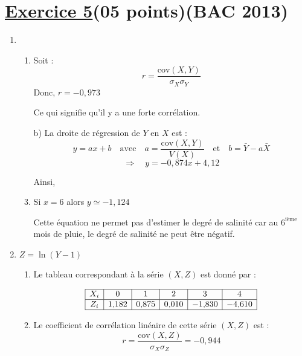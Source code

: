 \documentclass[12pt,a4paper]{article}
\begin{document}
\section*{\underline{Exercice 5}(05 points)(BAC 2013)}
\begin{enumerate}
    \item 
    \begin{enumerate}
        \item Soit : 
        \[
        r = \frac{\text{cov}(X, Y)}{\sigma_X \sigma_Y}
        \]
        Donc, \( r = -0{,}973 \)

        Ce qui signifie qu'il y a une forte corrélation.

        \item[b)] La droite de régression de \( Y \) en \( X \) est :
        \[
        y = ax + b \quad \text{avec} \quad 
        a = \frac{\text{cov}(X, Y)}{V(X)} 
        \quad \text{et} \quad 
        b = \bar{Y} - a\bar{X}
        \]
        \[
        \Rightarrow \quad y = -0{,}874x + 4{,}12
        \]

        Ainsi, 

        \item Si \( x = 6 \) alors \( y \simeq -1{,}124 \)

        Cette équation ne permet pas d'estimer le degré de salinité car au \( 6^{\text{ième}} \) mois de pluie, le degré de salinité ne peut être négatif.
    \end{enumerate}

    \item \( Z = \ln(Y - 1) \)

    \begin{enumerate}
        \item Le tableau correspondant à la série \( (X, Z) \) est donné par :

        \[
        \begin{array}{|c|c|c|c|c|c|c|}
        \hline
        X_i & 0 & 1 & 2 & 3 & 4 \\
        \hline
        Z_i & 1{,}182 & 0{,}875 & 0{,}010 & -1{,}830 & -4{,}610 \\
        \hline
        \end{array}
        \]

    \item  Le coefficient de corrélation linéaire de cette série \( (X, Z) \) est :
        \[
        r = \frac{\text{cov}(X, Z)}{\sigma_X \sigma_Z} = -0{,}944
        \]


\end{enumerate}
\end{enumerate}
\end{document}
